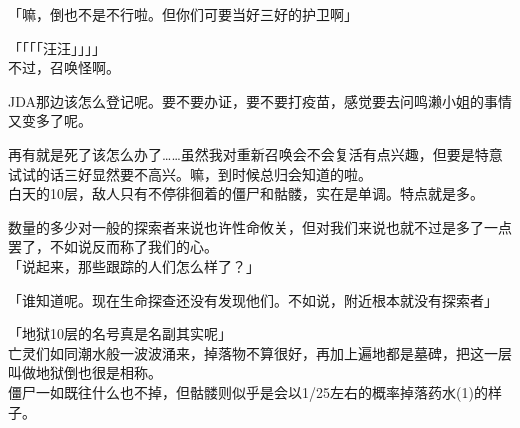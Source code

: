 「嘛，倒也不是不行啦。但你们可要当好三好的护卫啊」

「「「「汪汪」」」」\\

不过，召唤怪啊。

JDA那边该怎么登记呢。要不要办证，要不要打疫苗，感觉要去问鸣濑小姐的事情又变多了呢。

再有就是死了该怎么办了……虽然我对重新召唤会不会复活有点兴趣，但要是特意试试的话三好显然要不高兴。嘛，到时候总归会知道的啦。\\

% 
 

白天的10层，敌人只有不停徘徊着的僵尸和骷髅，实在是单调。特点就是多。

数量的多少对一般的探索者来说也许性命攸关，但对我们来说也就不过是多了一点罢了，不如说反而称了我们的心。\\

「说起来，那些跟踪的人们怎么样了？」

「谁知道呢。现在生命探查还没有发现他们。不如说，附近根本就没有探索者」

「地狱10层的名号真是名副其实呢」\\

亡灵们如同潮水般一波波涌来，掉落物不算很好，再加上遍地都是墓碑，把这一层叫做地狱倒也很是相称。\\

僵尸一如既往什么也不掉，但骷髅则似乎是会以1/25左右的概率掉落药水(1)的样子。\\

